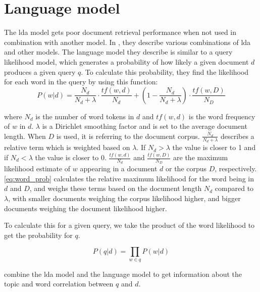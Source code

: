 \section{Language model}
The \gls{lda} model gets poor document retrieval performance when not used in combination with another model\cite{yang2009topic}.
In \cite{yang2009topic}, they describe various combinations of \gls{lda} and other models. 
The language model they describe is similar to a query likelihood model, which generates a probability of how likely a given document $d$ produces a given query $q$.
To calculate this probability, they find the likelihood for each word in the query by using this function:
\begin{equation}\label{eq:word_prob}
	P(w|d) = \frac{N_d}{N_d + \lambda} \cdot \frac{tf(w,d)}{N_d} + (1 - \frac{N_d}{N_d + \lambda}) \cdot \frac{tf(w,D)}{N_D}
\end{equation}

where $N_d$ is the number of word tokens in $d$ and $tf(w,d)$ is the word frequency of $w$ in $d$. $\lambda$ is a Dirichlet smoothing factor and is set to the average document length.
When $D$ is used, it is referring to the document corpus.
$ \frac{N_d}{N_d + \lambda} $ describes a relative term which is weighted based on $ \lambda $. If $N_d > \lambda$ the value is closer to 1 and if $ N_d < \lambda $ the value is closer to 0.
$ \frac{tf(w,d)}{N_d} $ and $\frac{tf(w,D)}{N_D}$ are the maximum likelihood estimate of $w$ appearing in a document $d$ or the corpus $D$, respectively.
\autoref{eq:word_prob} calculates the relative maximum likelihood for the word being in $ d $ and $ D $, and weighs these terms based on the document length $N_d$ compared to $\lambda$, with smaller documents weighing the corpus likelihood higher, and bigger documents weighing the document likelihood higher.

To calculate this for a given query, we take the product of the word likelihood to get the probability for $q$.

\begin{equation}\label{eq:query_prob}
	P(q|d) = \prod_{w \in q} P(w|d)
\end{equation}

\cite{yang2009topic} combine the \gls{lda} model and the language model to get information about the topic and word correlation between $q$ and $d$.
